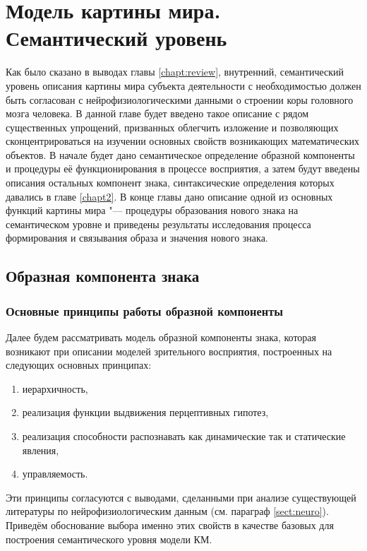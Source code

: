 \chapter{Модель картины мира. Семантический уровень} \label{chapt3}

Как было сказано в выводах главы \ref{chapt:review}, внутренний, семантический уровень описания картины мира субъекта деятельности с необходимостью должен быть согласован с нейрофизиологическими данными о строении коры головного мозга человека. В данной главе будет введено такое описание с рядом существенных упрощений, призванных облегчить изложение и позволяющих сконцентрироваться на изучении основных свойств возникающих математических объектов. В начале будет дано семантическое определение образной компоненты и процедуры её функционирования в процессе восприятия, а затем будут введены описания остальных компонент знака, синтаксические определения которых давались в главе \ref{chapt2}. В конце главы дано описание одной из основных функций картины мира "--- процедуры образования нового знака на семантическом уровне и приведены результаты исследования процесса формирования и связывания образа и значения нового знака.

\section{Образная компонента знака}\label{sect3_1}

\subsection{Основные принципы работы образной компоненты} \label{subsect3_1_1}

Далее будем рассматривать модель образной компоненты знака, которая возникают при описании моделей зрительного восприятия, построенных на следующих основных принципах:
\begin{enumerate}
	\item иерархичность,
	\item реализация функции выдвижения перцептивных гипотез,
	\item реализация способности распознавать как динамические так и статические явления,
	\item управляемость.
\end{enumerate}

Эти принципы согласуются с выводами, сделанными при анализе существующей литературы по нейрофизиологическим данным (см. параграф \ref{sect:neuro}). Приведём обоснование выбора именно этих свойств в качестве базовых для построения семантического уровня модели КМ.

